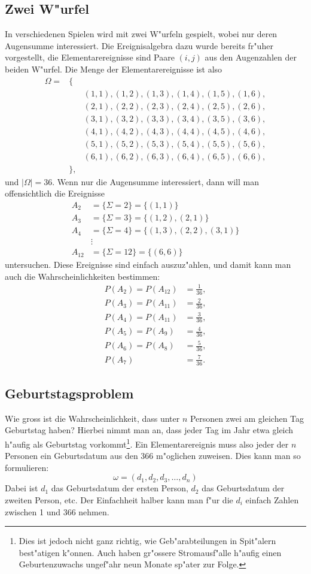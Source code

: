 \subsection{Zwei W"urfel}
In verschiedenen Spielen wird mit zwei W"urfeln gespielt, wobei nur
deren Augensumme interessiert.
Die Ereignisalgebra dazu wurde bereits
fr"uher vorgestellt, die Elementarereignisse sind Paare $(i,j)$ aus
den Augenzahlen der beiden W"urfel.
Die Menge der Elementarereignisse
ist also
\begin{eqnarray*}
\Omega=&\{&\\
&&(1,1),(1,2),(1,3),(1,4),(1,5),(1,6),\\
&&(2,1),(2,2),(2,3),(2,4),(2,5),(2,6),\\
&&(3,1),(3,2),(3,3),(3,4),(3,5),(3,6),\\
&&(4,1),(4,2),(4,3),(4,4),(4,5),(4,6),\\
&&(5,1),(5,2),(5,3),(5,4),(5,5),(5,6),\\
&&(6,1),(6,2),(6,3),(6,4),(6,5),(6,6),\\
&\},&
\end{eqnarray*}
und $|\Omega|=36$.
Wenn nur die Augensumme interessiert, dann will
man offensichtlich die Ereignisse
\begin{align*}
A_2&=\{\Sigma=2\}=\{(1,1)\}\\
A_3&=\{\Sigma=3\}=\{(1,2),(2,1)\}\\
A_4&=\{\Sigma=4\}=\{(1,3),(2,2),(3,1)\}\\
&\vdots\\
A_{12}&=\{\Sigma=12\}=\{(6,6)\}
\end{align*}
untersuchen.
Diese Ereignisse sind einfach auszuz"ahlen, und damit kann man auch
die Wahrscheinlichkeiten bestimmen:
\begin{align*}
P(A_2)=P(A_{12})&=\frac{1}{36},\\
P(A_3)=P(A_{11})&=\frac{2}{36},\\
P(A_4)=P(A_{11})&=\frac{3}{36},\\
P(A_5)=P(A_9)&=\frac{4}{36},\\
P(A_6)=P(A_8)&=\frac{5}{36},\\
P(A_7)&=\frac{7}{36}.
\end{align*}

\subsection{Geburtstagsproblem}
Wie gross ist die Wahrscheinlichkeit, dass unter $n$ Personen zwei
am gleichen Tag Geburtstag haben? Hierbei nimmt man an, dass
jeder Tag im Jahr etwa gleich h"aufig als Geburtstag
vorkommt\footnote{Dies ist
jedoch nicht ganz richtig, wie Geb"arabteilungen in Spit"alern
best"atigen k"onnen.
Auch haben gr"ossere Stromausf"alle h"aufig
einen Geburtenzuwachs ungef"ahr neun Monate sp"ater zur Folge.}.
Ein Elementarereignis muss also jeder der $n$ Personen ein
Geburtsdatum aus den $366$ m"oglichen zuweisen.
Dies kann man so
formulieren:
\[
\omega=(d_1, d_2, d_3,\dots,d_n)
\]
Dabei ist $d_1$ das Geburtsdatum der ersten Person, $d_2$ das
Geburtsdatum der zweiten Person, etc.
Der Einfachheit halber kann
man f"ur die $d_i$ einfach Zahlen zwischen 1 und 366 nehmen.

